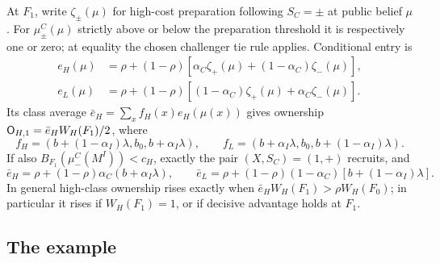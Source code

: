\begin{proposition}
At \(F_1\), write \(\zeta_\pm(\mu)\) for high-cost preparation following \(S_C=\pm\) at public belief \(\mu\).
For \(\mu^C_\pm(\mu)\) strictly above or below the preparation threshold it is respectively one or zero; at
equality the chosen challenger tie rule applies. Conditional entry is
\[
\begin{aligned}
e_H(\mu)&=\rho+(1-\rho)[\alpha_C\zeta_+(\mu)+(1-\alpha_C)\zeta_-(\mu)],\\
e_L(\mu)&=\rho+(1-\rho)[(1-\alpha_C)\zeta_+(\mu)+\alpha_C\zeta_-(\mu)].
\end{aligned}
\]
Its class average \(\bar e_H=\sum_x f_H(x)e_H(\mu(x))\) gives ownership \(\mathsf{O}_{H,1}=\bar e_HW_H(F_1)/2\), where
\[
f_H=(b+(1-\alpha_I)\lambda,b_0,b+\alpha_I\lambda),\qquad
f_L=(b+\alpha_I\lambda,b_0,b+(1-\alpha_I)\lambda).
\]
If also \(B_{F_1}(\mu^C_-(M^I))<c_H\), exactly the pair \((X,S_C)=(1,+)\) recruits, and
\[
\bar e_H=\rho+(1-\rho)\alpha_C(b+\alpha_I\lambda),\qquad
\bar e_L=\rho+(1-\rho)(1-\alpha_C)[b+(1-\alpha_I)\lambda].
\]
In general high-class ownership rises exactly when \(\bar e_HW_H(F_1)>\rho W_H(F_0)\); in particular it rises if
\(W_H(F_1)=1\), or if decisive advantage holds at \(F_1\).
\end{proposition}

\subsection*{The example}

